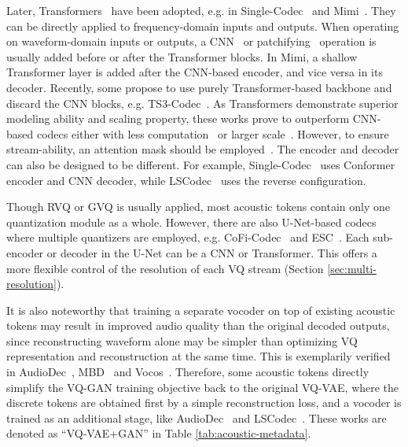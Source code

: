 Later, Transformers~\cite{transformer} have been adopted, e.g. in Single-Codec~\cite{singlecodec} and Mimi~\cite{kyutai2024moshi}.
They can be directly applied to frequency-domain inputs and outputs.
When operating on waveform-domain inputs or outputs, a CNN~\cite{kyutai2024moshi} or patchifying~\cite{wu2024ts3codectransformerbasedsimplestreaming,parker2024scalingtransformerslowbitratehighquality} operation is usually added before or after the Transformer blocks.
In Mimi, a shallow Transformer layer is added after the CNN-based encoder, and vice versa in its decoder.
Recently, some propose to use purely Transformer-based backbone and discard the CNN blocks, e.g. TS3-Codec~\cite{wu2024ts3codectransformerbasedsimplestreaming}.
As Transformers demonstrate superior modeling ability and scaling property, these works prove to outperform CNN-based codecs either with less computation~\cite{wu2024ts3codectransformerbasedsimplestreaming} or larger scale~\cite{parker2024scalingtransformerslowbitratehighquality}.
However, to ensure stream-ability, an attention mask should be employed~\cite{kyutai2024moshi}.
The encoder and decoder can also be designed to be different. 
For example, Single-Codec~\cite{singlecodec} uses Conformer~\cite{conformer} encoder and CNN decoder, while LSCodec~\cite{guo2024lscodec} uses the reverse configuration.

Though RVQ or GVQ is usually applied, most acoustic tokens contain only one quantization module as a whole.
However, there are also U-Net-based codecs where multiple quantizers are employed, e.g. CoFi-Codec~\cite{guo2024speaking} and ESC~\cite{gu2024esc}.
Each sub-encoder or decoder in the U-Net can be a CNN or Transformer.
This offers a more flexible control of the resolution of each VQ stream (Section \ref{sec:multi-resolution}).

It is also noteworthy that training a separate vocoder on top of existing acoustic tokens may result in improved audio quality than the original decoded outputs, since reconstructing waveform alone may be simpler than optimizing VQ representation and reconstruction at the same time.
This is exemplarily verified in AudioDec~\cite{audiodec}, MBD~\cite{san2023discrete} and Vocos~\cite{siuzdak2024vocos}.
Therefore, some acoustic tokens directly simplify the VQ-GAN training objective back to the original VQ-VAE, where the discrete tokens are obtained first by a simple reconstruction loss, and a vocoder is trained as an additional stage, like AudioDec~\cite{audiodec} and LSCodec~\cite{guo2024lscodec}.
These works are denoted as ``VQ-VAE+GAN'' in Table \ref{tab:acoustic-metadata}.

